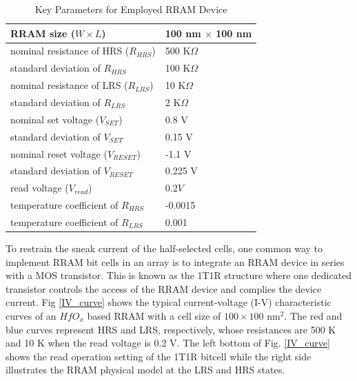 \begin{table}[!t]
\centering
\caption{Key Parameters for Employed RRAM Device}
\label{tab_model}
 \begin{threeparttable}
\begin{tabular}{@{}m{5cm}<{\centering}|m{2.5cm}<{\centering}@{}}
\toprule[1.5pt]
\hline
RRAM size ($W\times L$)     & 100 nm $\times$ 100 nm  \\\hline
nominal resistance of HRS ($R_{HRS}$)   & 500 K$\Omega$  \\\hline
standard deviation of $R_{HRS}$   & 100 K$\Omega$  \\\hline
nominal resistance of LRS ($R_{LRS}$)  & 10 K$\Omega$  \\\hline
standard deviation of $R_{LRS}$   & 2 K$\Omega$  \\\hline
nominal set voltage ($V_{SET}$)        & 0.8 V  \\\hline
standard deviation of $V_{SET}$        & 0.15 V  \\\hline
nominal reset voltage ($V_{RESET}$)      & -1.1 V  \\\hline
standard deviation of $V_{RESET}$        & 0.225 V  \\\hline
read voltage ($V_{read}$)	& $0.2V$  \\\hline
temperature coefficient of $R_{HRS}$	& -0.0015  \\\hline
temperature coefficient of $R_{LRS}$	& 0.001  \\\hline
\bottomrule[1.5pt]
\end{tabular}
\end{threeparttable}
\end{table} 
 

To restrain the sneak current of the half-selected cells, one common way to implement RRAM bit cells in an array is to integrate an RRAM device in series with a MOS transistor. This is known as the 1T1R structure \cite{6936923} where one dedicated transistor controls the access of the RRAM device and complies the device current.
Fig \ref{IV_curve} shows the typical current-voltage (I-V) characteristic curves of an $HfO_x$ based RRAM with a cell size of $100\times 100$ nm$^2$. The red and blue curves represent HRS and LRS, respectively, whose resistances are 500 K and 10 K when the read voltage is 0.2 V. The left bottom of Fig. \ref{IV_curve} shows the read operation setting of the 1T1R bitcell while the right side illustrates the RRAM physical model at the LRS and HRS states. 

